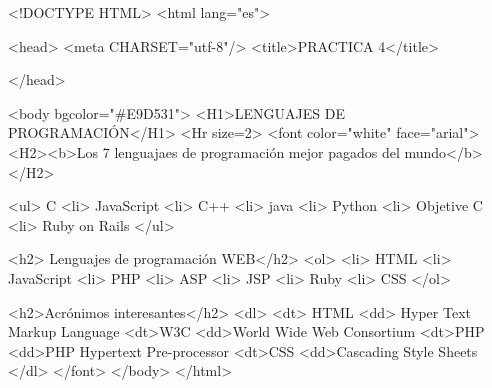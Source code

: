<!DOCTYPE HTML>
<html lang="es">
	
	<head>
		<meta CHARSET="utf-8"/>
		<title>PRACTICA 4</title>
		
	</head>

	<body bgcolor="#E9D531">
	<H1>LENGUAJES DE PROGRAMACIÓN</H1>
	<Hr size=2>
	<font  color="white" face="arial">
	<H2><b>Los 7 lenguajaes de programación mejor pagados del mundo</b></H2>
	
	<ul> C
	<li> JavaScript
	<li> C++
	<li> java
	<li> Python
	<li> Objetive C
	<li> Ruby on Rails
    </ul>
	
	<h2> Lenguajes de programación WEB</h2>
	<ol>
	<li> HTML
	<li> JavaScript
	<li> PHP
	<li> ASP
	<li> JSP
	<li> Ruby
	<li> CSS
	</ol>
	
	
	<h2>Acrónimos interesantes</h2>
	<dl>
	<dt> HTML
	<dd> Hyper Text Markup Language
	<dt>W3C
	<dd>World Wide Web Consortium
	<dt>PHP
	<dd>PHP Hypertext Pre-processor
	<dt>CSS
	<dd>Cascading Style Sheets
	</dl>
    </font>
	</body>
</html>